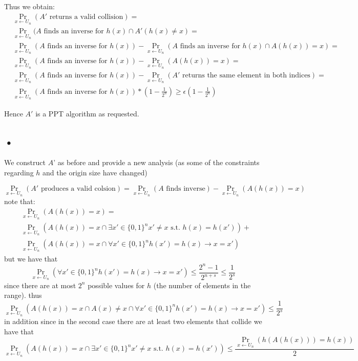 \documentclass{article}
\begin{document}
Thus we obtain:
\begin{align*}
&\Pr_{x \leftarrow U_n}(A' \mbox{ returns a valid collision}) =\\
& \Pr_{x \leftarrow U_n}(A \mbox{ finds an inverse for } h(x) \cap A'(h(x) \neq x) = \\
&  \Pr_{x \leftarrow U_n}(A \mbox{ finds an inverse for } h(x)) -  \Pr_{x \leftarrow U_n}(A \mbox{ finds an inverse for } h(x) \cap A(h(x)) = x )=\\
&  \Pr_{x \leftarrow U_n}(A \mbox{ finds an inverse for } h(x)) -  \Pr_{x \leftarrow U_n}(A(h(x)) = x )=\\
 & \Pr_{x \leftarrow U_n}(A \mbox{ finds an inverse for } h(x)) - \Pr_{x \leftarrow U_n}(A'\mbox{ returns the same element in both indices}) =\\
 &  \Pr_{x \leftarrow U_n}(A \mbox{ finds an inverse for } h(x)) * (1-  \frac{1}{2^n})  \geq \epsilon(1-\frac{1}{2^n})
\end{align*}

Hence $A'$ is a PPT algorithm as requested.

\subsection{•}
We construct $A$' as before and provide a new analysis (as some of the constraints regarding $h$  and the origin size have changed)

\[\Pr_{x \leftarrow U_n}(A' \mbox{ produces a valid colsion}) = \Pr_{x \leftarrow U_n}(A \mbox{ finds inverse}) - \Pr_{x \leftarrow U_n}(A(h(x)) = x)\]
note that:
\begin{align*}
& \Pr_{x \leftarrow U_n}(A(h(x)) = x) = \\
&\Pr_{x \leftarrow U_n}(A(h(x)) = x \cap \exists x' \in \{0,1\}^n x' \neq x \mbox{ s.t. } h(x) = h(x')) +\\
& \Pr_{x \leftarrow U_n}(A(h(x)) = x \cap \forall x' \in \{0,1\}^n h(x') = h(x) \rightarrow x = x')
\end{align*}
but we have that 
\[\Pr_{x \leftarrow U_n}(\forall x' \in \{0,1\}^n h(x') = h(x) \rightarrow x = x') \leq \frac{2^n - 1}{2^{n+s}} \leq \frac{1}{2^s}\]
since there are at most $2^{n}$ possible values for $h$ (the number of elements in the range).
thus
\[ \Pr_{x \leftarrow U_n}(A(h(x)) = x \cap A(x) \neq x \cap \forall x' \in \{0,1\}^n h(x') = h(x) \rightarrow x = x') \leq \frac{1}{2^s}\]
in addition since in the second case there are at least two elements that collide we have that
\[\Pr_{x \leftarrow U_n}(A(h(x)) = x \cap \exists x' \in \{0,1\}^n x' \neq x \mbox{ s.t. } h(x) = h(x')) \leq \frac{\Pr_{x \leftarrow U_n}(h(A(h(x))) = h(x))}{2}\]
\end{document}
